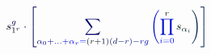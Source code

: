 \documentclass[12pt]{article}
\begin{document}
\makeatletter
\renewcommand*{\@textcolor}[3]{%
  \protect\leavevmode
  \begingroup
    \color#1{#2}#3%
  \endgroup
}
\makeatother
\begin{displaymath}
\mathcolor[RGB]{0,0,15}{s} _ { \mathcolor[RGB]{0,0,30}{1} ^ { \mathcolor[RGB]{0,0,45}{r} } } ^ { \mathcolor[RGB]{0,0,60}{g} } \mathcolor[RGB]{0,0,75}{\cdot} \mathcolor[RGB]{0,0,90}{\left[} \mathcolor[RGB]{0,0,105}{\sum} _ { \mathcolor[RGB]{0,0,120}{\alpha} _ { \mathcolor[RGB]{0,0,135}{0} } \mathcolor[RGB]{0,0,150}{+} \mathcolor[RGB]{0,0,165}{.} \mathcolor[RGB]{0,0,180}{.} \mathcolor[RGB]{0,0,195}{.} \mathcolor[RGB]{0,0,210}{+} \mathcolor[RGB]{0,0,225}{\alpha} _ { \mathcolor[RGB]{0,0,240}{r} } \mathcolor[RGB]{0,0,255}{=} \mathcolor[RGB]{0,15,0}{(} \mathcolor[RGB]{0,15,15}{r} \mathcolor[RGB]{0,15,30}{+} \mathcolor[RGB]{0,15,45}{1} \mathcolor[RGB]{0,15,60}{)} \mathcolor[RGB]{0,15,75}{(} \mathcolor[RGB]{0,15,90}{d} \mathcolor[RGB]{0,15,105}{-} \mathcolor[RGB]{0,15,120}{r} \mathcolor[RGB]{0,15,135}{)} \mathcolor[RGB]{0,15,150}{-} \mathcolor[RGB]{0,15,165}{r} \mathcolor[RGB]{0,15,180}{g} } \mathcolor[RGB]{0,15,195}{\left(} \mathcolor[RGB]{0,15,210}{\prod} _ { \mathcolor[RGB]{0,15,225}{i} \mathcolor[RGB]{0,15,240}{=} \mathcolor[RGB]{0,15,255}{0} } ^ { \mathcolor[RGB]{0,30,0}{r} } \mathcolor[RGB]{0,30,15}{s} _ { \mathcolor[RGB]{0,30,30}{\alpha} _ { \mathcolor[RGB]{0,30,45}{i} } } \mathcolor[RGB]{0,30,60}{\right)} \mathcolor[RGB]{0,30,75}{\right]}
\end{displaymath}
\end{document}
